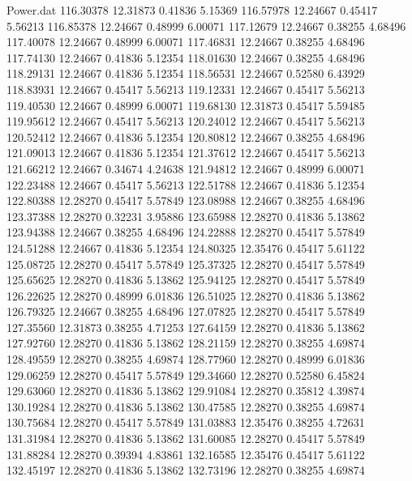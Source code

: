 \begin{filecontents}{Power.dat}
 116.30378   12.31873    0.41836    5.15369
 116.57978   12.24667    0.45417    5.56213
 116.85378   12.24667    0.48999    6.00071
 117.12679   12.24667    0.38255    4.68496
 117.40078   12.24667    0.48999    6.00071
 117.46831   12.24667    0.38255    4.68496
 117.74130   12.24667    0.41836    5.12354
 118.01630   12.24667    0.38255    4.68496
 118.29131   12.24667    0.41836    5.12354
 118.56531   12.24667    0.52580    6.43929
 118.83931   12.24667    0.45417    5.56213
 119.12331   12.24667    0.45417    5.56213
 119.40530   12.24667    0.48999    6.00071
 119.68130   12.31873    0.45417    5.59485
 119.95612   12.24667    0.45417    5.56213
 120.24012   12.24667    0.45417    5.56213
 120.52412   12.24667    0.41836    5.12354
 120.80812   12.24667    0.38255    4.68496
 121.09013   12.24667    0.41836    5.12354
 121.37612   12.24667    0.45417    5.56213
 121.66212   12.24667    0.34674    4.24638
 121.94812   12.24667    0.48999    6.00071
 122.23488   12.24667    0.45417    5.56213
 122.51788   12.24667    0.41836    5.12354
 122.80388   12.28270    0.45417    5.57849
 123.08988   12.24667    0.38255    4.68496
 123.37388   12.28270    0.32231    3.95886
 123.65988   12.28270    0.41836    5.13862
 123.94388   12.24667    0.38255    4.68496
 124.22888   12.28270    0.45417    5.57849
 124.51288   12.24667    0.41836    5.12354
 124.80325   12.35476    0.45417    5.61122
 125.08725   12.28270    0.45417    5.57849
 125.37325   12.28270    0.45417    5.57849
 125.65625   12.28270    0.41836    5.13862
 125.94125   12.28270    0.45417    5.57849
 126.22625   12.28270    0.48999    6.01836
 126.51025   12.28270    0.41836    5.13862
 126.79325   12.24667    0.38255    4.68496
 127.07825   12.28270    0.45417    5.57849
 127.35560   12.31873    0.38255    4.71253
 127.64159   12.28270    0.41836    5.13862
 127.92760   12.28270    0.41836    5.13862
 128.21159   12.28270    0.38255    4.69874
 128.49559   12.28270    0.38255    4.69874
 128.77960   12.28270    0.48999    6.01836
 129.06259   12.28270    0.45417    5.57849
 129.34660   12.28270    0.52580    6.45824
 129.63060   12.28270    0.41836    5.13862
 129.91084   12.28270    0.35812    4.39874
 130.19284   12.28270    0.41836    5.13862
 130.47585   12.28270    0.38255    4.69874
 130.75684   12.28270    0.45417    5.57849
 131.03883   12.35476    0.38255    4.72631
 131.31984   12.28270    0.41836    5.13862
 131.60085   12.28270    0.45417    5.57849
 131.88284   12.28270    0.39394    4.83861
 132.16585   12.35476    0.45417    5.61122
 132.45197   12.28270    0.41836    5.13862
 132.73196   12.28270    0.38255    4.69874

\end{filecontents}
